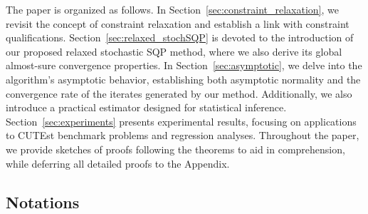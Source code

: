 \documentclass[aos]{imsart}
\numberwithin{equation}{section}
\theoremstyle{plain}
\begin{document}
The paper is organized as follows. 
In Section~\ref{sec:constraint_relaxation}, we revisit the concept of constraint relaxation and establish a link with constraint qualifications. 
Section~\ref{sec:relaxed_stochSQP} is devoted to the introduction of our proposed relaxed stochastic SQP method, where we also derive its global almost-sure convergence properties. 
In Section~\ref{sec:asymptotic}, we delve into the algorithm's asymptotic behavior, establishing both asymptotic normality and the convergence rate of the iterates generated by our method. 
Additionally, we also introduce a practical estimator designed for statistical inference. 
Section~\ref{sec:experiments} presents experimental results, focusing on applications to CUTEst benchmark problems and regression analyses. 
Throughout the paper, we provide sketches of proofs following the theorems to aid in comprehension, while deferring all detailed proofs to the Appendix.


\subsection{Notations} 
\end{document}
